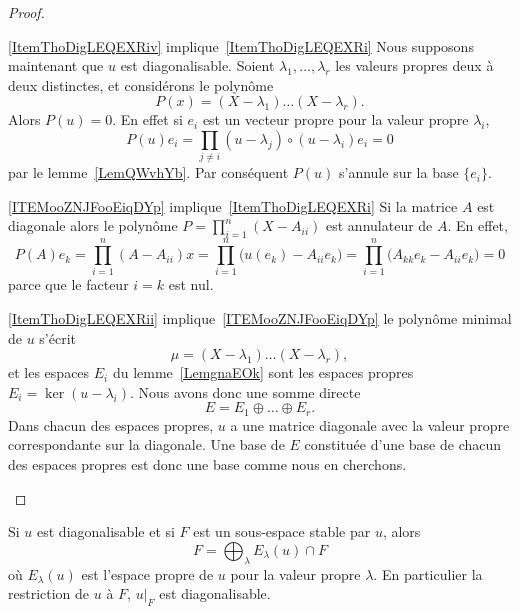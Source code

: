\begin{proof}
\begin{subproof}
    \item[\ref{ItemThoDigLEQEXRiv} implique~\ref{ItemThoDigLEQEXRi}] Nous supposons maintenant que \( u\) est diagonalisable. Soient \( \lambda_1,\ldots, \lambda_r\) les valeurs propres deux à deux distinctes, et considérons le polynôme
    \begin{equation}
        P(x)=(X-\lambda_1)\ldots (X-\lambda_r).
    \end{equation}
    Alors \( P(u)=0\). En effet si \( e_i\) est un vecteur propre pour la valeur propre \( \lambda_i\),
    \begin{equation}
        P(u)e_i=\prod_{j\neq i}(u-\lambda_j)\circ(u-\lambda_i)e_i=0
    \end{equation}
    par le lemme~\ref{LemQWvhYb}. Par conséquent \( P(u)\) s'annule sur la base \( \{ e_i \}\).

    \item[\ref{ITEMooZNJFooEiqDYp} implique~\ref{ItemThoDigLEQEXRi}]
    Si la matrice \( A\) est diagonale alors le polynôme \( P=\prod_{i=1}^n(X-A_{ii})\) est annulateur de \( A\). En effet,
    \begin{equation}
        P(A)e_k=\prod_{i=1}^n(A-A_{ii})x=\prod_{i=1}^n\big( u(e_k)-A_{ii}e_k \big)=\prod_{i=1}^n\big( A_{kk}e_k-A_{ii}e_k \big)=0
    \end{equation}
    parce que le facteur \( i=k\) est nul.
    \item[\ref{ItemThoDigLEQEXRii} implique~\ref{ITEMooZNJFooEiqDYp}]
        le polynôme minimal de \( u\) s'écrit
        \begin{equation}
            \mu=(X-\lambda_1)\ldots(X-\lambda_r),
        \end{equation}
        et les espaces $E_i$ du lemme~\ref{LemgnaEOk} sont les espaces propres \( E_i=\ker(u-\lambda_i)\). Nous avons donc une somme directe
        \begin{equation}
            E=E_1\oplus\ldots\oplus E_r.
        \end{equation}
        Dans chacun des espaces propres, $u$ a une matrice diagonale avec la valeur propre correspondante sur la diagonale. Une base de \( E\) constituée d'une base de chacun des espaces propres est donc une base comme nous en cherchons.
    \end{subproof}
\end{proof}

\begin{corollary}       \label{CorQeVqsS}
    Si \( u\) est diagonalisable et si \( F\) est un sous-espace stable par \( u\), alors
    \begin{equation}
        F=\bigoplus_{\lambda}E_{\lambda}(u)\cap F
    \end{equation}
    où \( E_{\lambda}(u)\) est l'espace propre de \( u\) pour la valeur propre \( \lambda\). En particulier la restriction de \( u\) à \( F\), \( u|_F\) est diagonalisable.
\end{corollary}

